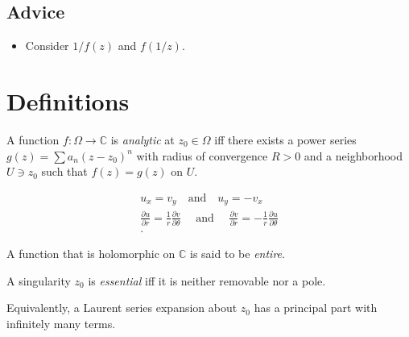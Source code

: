 \hypertarget{advice}{%
\subsection{Advice}\label{advice}}

\begin{itemize}
\tightlist
\item
  Consider \(1/f(z)\) and \(f(1/z)\).
\end{itemize}

\hypertarget{definitions}{%
\section{Definitions}\label{definitions}}

\begin{definition}[Analytic]

A function \(f:\Omega \to {\mathbb{C}}\) is \emph{analytic} at
\(z_0\in \Omega\) iff there exists a power series
\(g(z) = \sum a_n (z-z_0)^n\) with radius of convergence \(R>0\) and a
neighborhood \(U\ni z_0\) such that \(f(z) = g(z)\) on \(U\).

\end{definition}

\begin{definition}

\begin{align*}
u_x = v_y \quad\text{and}\quad u_y = -v_x \\
\frac{\partial u}{\partial r}=\frac{1}{r} \frac{\partial v}{\partial \theta} \quad \text { and } \quad \frac{\partial v}{\partial r}=-\frac{1}{r} \frac{\partial u}{\partial \theta} \\
.\end{align*}

\end{definition}

\begin{definition}[Entire]

A function that is holomorphic on \({\mathbb{C}}\) is said to be
\emph{entire}.

\end{definition}

\begin{definition}

A singularity \(z_0\) is \emph{essential} iff it is neither removable
nor a pole.

Equivalently, a Laurent series expansion about \(z_0\) has a principal
part with infinitely many terms.

\end{definition}

